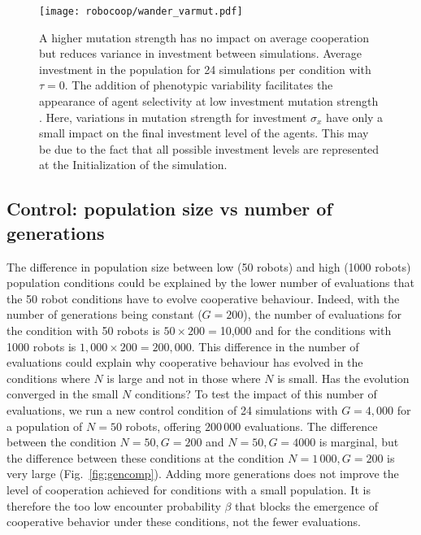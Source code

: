 \begin{figure}[tbhp]
    \begin{center}
        \texttt{[image: robocoop/wander\_varmut.pdf]}
        \vskip 0.25cm
        \caption{A higher mutation strength has no impact on average cooperation but reduces variance in investment between simulations.
        Average investment in the population for 24 simulations per condition with $\tau = 0$. The addition of phenotypic variability facilitates the appearance of agent selectivity at low investment mutation strength \citep{McNamara2010c}. Here, variations in mutation strength for investment $\sigma_x$ %
        have only a small impact on the final investment level of the agents. This may be due to the fact that all possible investment levels are represented at the Initialization of the simulation.
        }
    \label{fig:varmut}
    \end{center}
\end{figure}



\subsection{Control: population size vs number of generations}

The difference in population size between low (50 robots) and high (1000 robots) population conditions could be explained by the lower number of evaluations that the 50 robot conditions have to evolve cooperative behaviour. Indeed, with the number of generations being constant ($G = 200$), the number of evaluations for the condition with 50 robots is $50 \times 200 = $10,000 and for the conditions with 1000 robots is $1,000 \times 200 = 200,000$. This difference in the number of evaluations could explain why cooperative behaviour has evolved in the conditions where $N$ is large and not in those where $N$ is small. Has the evolution converged in the small $N$ conditions? %
To test the impact of this number of evaluations, we run a new control condition of 24 simulations with $G = 4,000$ for a population of $N=50$ robots, offering $200\,000$ evaluations. %
The difference between the condition $N=50, G=200$ and $N=50, G=4000$ is marginal, but the difference between these conditions at the condition $N=1\,000, G=200$ is very large (Fig.~\ref{fig:gencomp}). Adding more generations does not improve the level of cooperation achieved for conditions with a small population. %
It is therefore the too low encounter probability $\beta$ that blocks the emergence of cooperative behavior under these conditions, not the fewer evaluations. %


